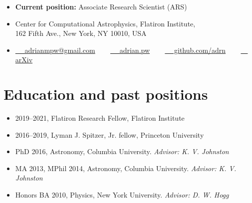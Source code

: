 \documentclass[12pt, letterpaper]{apw-cv}
\begin{document}
\thispagestyle{empty}\sloppy\sloppypar




\begin{itemize}
  \item \textbf{Current position:} Associate Research Scientist (ARS)
  \item Center for Computational Astrophysics, Flatiron Institute, \\ 162 Fifth Ave., New York, NY 10010, USA
  \item
    \href{mailto:adrianmpw@gmail.com}{\faEnvelope ~~ adrianmpw@gmail.com}
    ~~~
	\href{http://adrian.pw}{\faExternalLink* ~~ adrian.pw}
    ~~~
	\href{https://github.com/adrn}{\faGithub ~~ github.com/adrn}
    ~~~
    \href{\arxivurl}{\faFile ~~ arXiv}
\end{itemize}




\section*{Education and past positions}
	\begin{itemize}
        \item 2019--2021, Flatiron Research Fellow, Flatiron Institute
        \item 2016--2019, Lyman J. Spitzer, Jr. fellow, Princeton University
	\item PhD 2016, Astronomy, Columbia University.
		{\it Advisor: K. V. Johnston}
	\item MA 2013, MPhil 2014, Astronomy, Columbia University.
		{\it Advisor: K. V. Johnston}
	\item Honors BA 2010, Physics, New York University.
		{\it Advisor: D. W. Hogg}
	\end{itemize}
\end{document}
